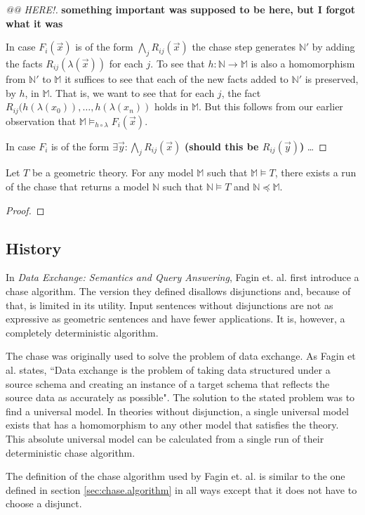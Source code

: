 \begin{proof}
			[@@ HERE!] \textbf{something important was supposed to be here, but I forgot what it was}

			In case $F_i(\vec x)$ is of the form $\bigwedge_j R_{ij}(\vec x)$
			the chase step generates $\mathbb{N}'$ by adding the facts
			$R_{ij}(\lambda(\vec{x}))$ for each $j$. To see that $h :
			\mathbb{N} \to \mathbb{M}$ is also a homomorphism from
			$\mathbb{N}'$ to $\mathbb{M}$ it suffices to see that each of the
			new facts added to $\mathbb{N}'$ is preserved, by $h$, in
			$\mathbb{M}$. That is, we want to see that for each $j$, the fact
			$R_{ij}(h(\lambda(x_0)),\ldots,h(\lambda(x_n))$ holds in
			$\mathbb{M}$. But this follows from our earlier observation that
			$\mathbb{M} \models_{h\circ\lambda} F_i(\vec{x})$.

			In case $F_i$ is of the form $\exists \vec{y} : \bigwedge_j
			R_{ij}(\vec x)$ \textbf{(should this be $R_{ij}(\vec y)$)} \ldots
		\end{proof}

		\begin{theorem}
			Let $T$ be a geometric theory. For any model $\mathbb{M}$ such that
			$\mathbb{M} \models T$, there exists a run of the chase that
			returns a model $\mathbb{N}$ such that $\mathbb{N} \models T$ and
			$\mathbb{N} \preceq \mathbb{M}$.

		\end{theorem}

		\begin{proof}
			
		\end{proof}

	\subsection{History}

		In \cite{FKMP02} \emph{Data Exchange: Semantics and Query Answering},
		Fagin et. al. first introduce a chase algorithm. The version they
		defined disallows disjunctions and, because of that, is limited in its
		utility. Input sentences without disjunctions are not as expressive
		as geometric sentences and have fewer applications. It is, however, a
		completely deterministic algorithm.

		The chase was originally used to solve the problem of data exchange. As
		Fagin et al. states, ``Data exchange is the problem of taking data
		structured under a source schema and creating an instance of a target
		schema that reflects the source data as accurately as possible". The
		solution to the stated problem was to find a universal model. In theories
		without disjunction, a single universal model exists that has a
		homomorphism to any other model that satisfies the theory. This
		absolute universal model can be calculated from a single run of their
		deterministic chase algorithm.

		The definition of the chase algorithm used by Fagin et. al. is similar
		to the one defined in section \ref{sec:chase.algorithm} in all ways
		except that it does not have to choose a disjunct.

